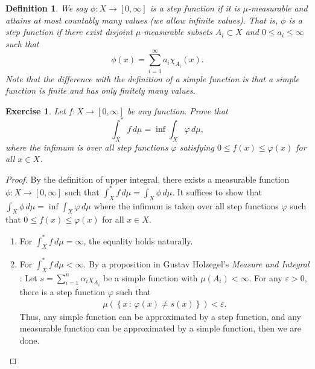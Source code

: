\documentclass[11pt]{book}
\newtheorem{definition}{Definition}[chapter]
\newtheorem{exercise}{Exercise}[section]
\theoremstyle{definition}
\numberwithin{equation}{chapter}
\begin{document}
\medskip

\begin{definition}
We say $\phi:X \to [0,\infty]$ is a \textit{step function} if it is $\mu$-measurable and attains at most countably many values (we allow infinite values). That is, $\phi$ is a step function if there exist  disjoint $\mu$-measurable subsets $A_i \subset X $ and $0 \leq a_i \leq \infty $ such that
$$
\phi(x) = \sum_{i=1}^\infty a_i \chi_{A_i}(x).
$$
Note that the difference with the definition of a simple function is that a simple function is finite and has only finitely many values.
\end{definition}

\medskip

\begin{exercise}
Let $f:X \to [0,\infty]$ be any function. Prove that
$$
\int^*_X f \,d\mu = \inf \int_X \varphi \,d\mu,
$$
where the infimum is over all step functions $\varphi$ satisfying
$0 \leq f(x) \leq \varphi(x)$ for all $x\in X$.
\end{exercise}
\begin{proof}
By the definition of upper integral, there exists a measurable function $\phi: X \to [0,\infty]$ such that $\int^*_X f \,d\mu = \int_X \phi \,d\mu$. It suffices to show that $\int_X \phi \,d\mu = \inf \int_X \varphi \,d\mu$ where the infimum is taken over all step functions $\varphi$ such that $0 \leq f(x) \leq \varphi(x)$ for all $x \in X$.
\begin{enumerate}[label=(\alph*)]
    \item For $\int^*_X f \,d\mu = \infty$, the equality holds naturally.
    
    \item For $\int^*_X f \,d\mu < \infty$. By a proposition in Gustav Holzegel's {\em Measure and Integral} \cite{35}: Let $s = \sum^n_{i=1} \alpha_i \chi_{A_i}$ be a simple function with $\mu(A_i) < \infty$. For any $\varepsilon > 0$, there is a step function $\varphi$ such that 
    \begin{align*}
        \mu\left(\left\{x \,:\, \varphi(x) \neq s(x)\right\}\right) < \varepsilon.
    \end{align*}
    Thus, any simple function can be approximated by a step function, and any measurable function can be approximated by a simple function, then we are done.
\end{enumerate}
\end{proof}

\medskip
\end{document}
